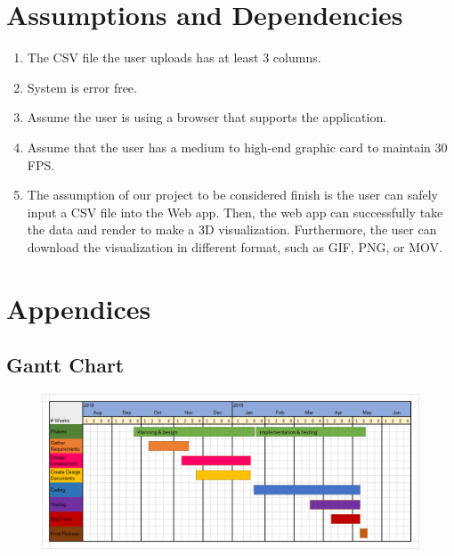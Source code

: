 \documentclass[journal,10pt,onecolumn,compsoc]{IEEEtran} \usepackage[margin=1.0in]{geometry} \usepackage{pdfpages}
\begin{document}
\section{Assumptions and Dependencies}
\begin{enumerate}
    \item The CSV file the user uploads has at least 3 columns.
    \item System is error free.
    \item Assume the user is using a browser that supports the application.
    \item Assume that the user has a medium to high-end graphic card to maintain 30 FPS.
    \item The assumption of our project to be considered finish is the user can safely input a CSV file into the Web app. Then, the web app can successfully take the data and render to make a 3D visualization. Furthermore, the user can download the visualization in different format, such as GIF, PNG, or MOV.
\end{enumerate}
    
\section{Appendices}
    \subsection{Gantt Chart}
     \begin{figure}[H]
         \centering
                \includegraphics[width=\linewidth]{./gantt.png}
     \end{figure}
 
\newpage  
\newpage  
\nocite{*}%


\end{document}
